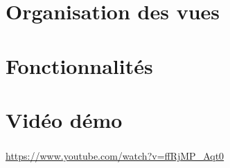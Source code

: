 \documentclass[11pt]{beamer}
\begin{document}
\section{Organisation des vues}
\begin{frame}
	\frametitle{\currentname}
  
\end{frame}

\section{Fonctionnalités}
\begin{frame}
	\frametitle{\currentname}
  
\end{frame}

\section{Vidéo démo}
\begin{frame}
	\frametitle{\currentname}
  
	\begin{center}
    \url{https://www.youtube.com/watch?v=ffRjMP_Aqt0}
	\end{center}
\end{frame}
\end{document}
